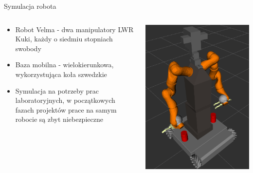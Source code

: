 
\begin{frame}{Symulacja robota}
	\begin{columns}
		\begin{column}{0.5\textwidth}
			\begin{itemize}
				\item Robot Velma - dwa manipulatory LWR Kuki, każdy o siedmiu stopniach swobody
				\item Baza mobilna - wielokierunkowa, wykorzystująca koła szwedzkie
				\item Symulacja na potrzeby prac laboratoryjnych, w początkowych fazach projektów prace na samym robocie są zbyt niebezpieczne
			\end{itemize}
		\end{column}
		\begin{column}{0.5\textwidth}
			\begin{center}
				\includegraphics[height=0.7\textheight]{img/velma_wizualizacja.png} 
			\end{center}
		\end{column}		
	\end{columns}
	
\end{frame}


